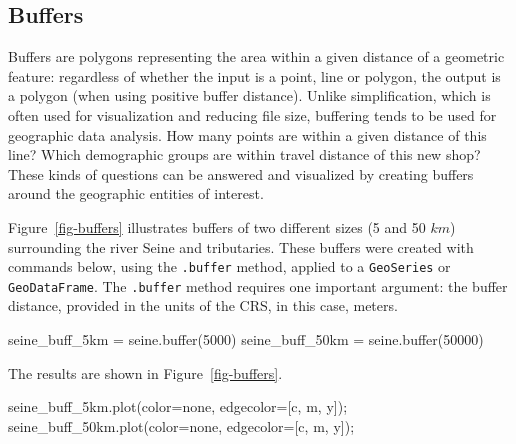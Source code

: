 \documentclass[
  letterpaper,
]{krantz}
\newenvironment{Shaded}{\begin{snugshade}}{\end{snugshade}}
\newcommand{\BuiltInTok}[1]{\textcolor[rgb]{0.00,0.23,0.31}{#1}}
\newcommand{\DecValTok}[1]{\textcolor[rgb]{0.68,0.00,0.00}{#1}}
\newcommand{\NormalTok}[1]{\textcolor[rgb]{0.00,0.23,0.31}{#1}}
\newcommand{\OperatorTok}[1]{\textcolor[rgb]{0.37,0.37,0.37}{#1}}
\newcommand{\StringTok}[1]{\textcolor[rgb]{0.13,0.47,0.30}{#1}}
\begin{document}
\subsection{Buffers}\label{sec-buffers}

Buffers are polygons representing the area within a given distance of a
geometric feature: regardless of whether the input is a point, line or
polygon, the output is a polygon (when using positive buffer distance).
Unlike simplification, which is often used for visualization and
reducing file size, buffering tends to be used for geographic data
analysis. How many points are within a given distance of this line?
Which demographic groups are within travel distance of this new shop?
These kinds of questions can be answered and visualized by creating
buffers around the geographic entities of interest.

Figure~\ref{fig-buffers} illustrates buffers of two different sizes (5
and 50 \(km\)) surrounding the river Seine and tributaries. These
buffers were created with commands below, using the \texttt{.buffer}
method, applied to a \texttt{GeoSeries} or \texttt{GeoDataFrame}. The
\texttt{.buffer} method requires one important argument: the buffer
distance, provided in the units of the CRS, in this case, meters.

\begin{Shaded}
\begin{Highlighting}[]
\NormalTok{seine\_buff\_5km }\OperatorTok{=}\NormalTok{ seine.}\BuiltInTok{buffer}\NormalTok{(}\DecValTok{5000}\NormalTok{)}
\NormalTok{seine\_buff\_50km }\OperatorTok{=}\NormalTok{ seine.}\BuiltInTok{buffer}\NormalTok{(}\DecValTok{50000}\NormalTok{)}
\end{Highlighting}
\end{Shaded}

The results are shown in Figure~\ref{fig-buffers}.

\begin{Shaded}
\begin{Highlighting}[]
\NormalTok{seine\_buff\_5km.plot(color}\OperatorTok{=}\StringTok{\textquotesingle{}none\textquotesingle{}}\NormalTok{, edgecolor}\OperatorTok{=}\NormalTok{[}\StringTok{\textquotesingle{}c\textquotesingle{}}\NormalTok{, }\StringTok{\textquotesingle{}m\textquotesingle{}}\NormalTok{, }\StringTok{\textquotesingle{}y\textquotesingle{}}\NormalTok{])}\OperatorTok{;}
\NormalTok{seine\_buff\_50km.plot(color}\OperatorTok{=}\StringTok{\textquotesingle{}none\textquotesingle{}}\NormalTok{, edgecolor}\OperatorTok{=}\NormalTok{[}\StringTok{\textquotesingle{}c\textquotesingle{}}\NormalTok{, }\StringTok{\textquotesingle{}m\textquotesingle{}}\NormalTok{, }\StringTok{\textquotesingle{}y\textquotesingle{}}\NormalTok{])}\OperatorTok{;}
\end{Highlighting}
\end{Shaded}
\end{document}
